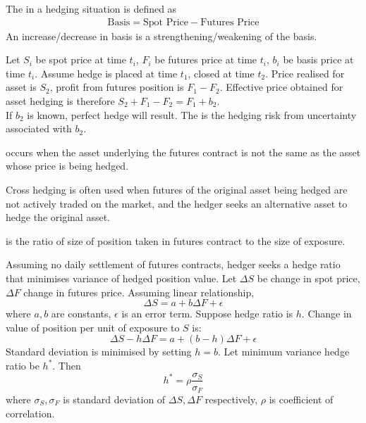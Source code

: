 \documentclass[a4paper,oneside,openany]{book}
\begin{document}
\begin{definition}
The  in a hedging situation is defined as
\begin{align*}
\text{Basis} = \text{Spot Price} - \text{Futures Price} \nonumber
\end{align*}
An increase/decrease in basis is a strengthening/weakening of the basis.
\end{definition}

\begin{definition}
Let $S_i$ be spot price at time $t_i$, $F_i$ be futures price at time $t_i$, $b_i$ be basis price at time $t_i$.	 Assume hedge is placed at time $t_1$, closed at time $t_2$. Price realised for asset is $S_2$, profit from futures position is $F_1 - F_2$.  Effective price obtained for asset hedging is therefore $S_2 + F_1 - F_2 = F_1 + b_2$.\\
If $b_2$ is known, perfect hedge will result. The  is the hedging risk from uncertainty associated with $b_2$.
\end{definition}

\begin{definition}
 occurs when the asset underlying the futures contract is not the same as the asset whose price is being hedged.
\end{definition}

Cross hedging is often used when futures of the original asset being hedged are not actively traded on the market, and the hedger seeks an alternative asset to hedge the original asset.

\begin{definition}
 is the ratio of size of position taken in futures contract to the size of exposure.
\end{definition}

Assuming no daily settlement of futures contracts, hedger seeks a hedge ratio that minimises variance of hedged position value. Let $\Delta S$ be change in spot price, $\Delta F$ change in futures price. Assuming linear relationship,
\begin{equation*}
\Delta S = a + b \Delta F + \epsilon	 \nonumber
\end{equation*}
where $a,b$ are constants, $\epsilon$ is an error term. Suppose hedge ratio is $h$. Change in value of position per unit of exposure to $S$ is:
\begin{equation*}
\Delta S - h \Delta F = a + (b-h) \Delta F + \epsilon \nonumber
\end{equation*}
Standard deviation is minimised by setting $h=b$. Let minimum variance hedge ratio be $h^*$. Then
\begin{equation*}
h^* = \rho \frac{\sigma_S}{\sigma_F} \nonumber
\end{equation*}
where $\sigma_S, \sigma_F$ is standard deviation of $\Delta S, \Delta F$ respectively, $\rho$ is coefficient of correlation.
\end{document}
